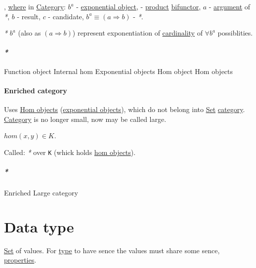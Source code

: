 \documentclass[a4paper,14pt,oneside]{book}
\begin{document}

, \hyperref[orgbe7070f]{where} in \hyperref[org82baa03]{Category}: \(b^{a}\) - \hyperref[orgab05585]{exponential object}, \texttimes{} - \hyperref[org917411a]{product} \hyperref[orga80441c]{bifunctor}, \(a\) - \hyperref[org7be5baf]{argument} of \emph{*}, \(b\) - result, \(c\) - candidate, \(b^{a} \equiv ( a \Rightarrow b )\) - \emph{*}.

\emph{*} \(b^{a}\) (also as \((a \Rightarrow b)\)) represent exponentiation of \hyperref[org650116d]{cardinality} of \(\forall b^{a}\) possiblities.

\subsubsection{\emph{*}}
\label{sec:orgf3f0c62}
\label{org10fe0e7}Function object
\label{org17ab044}Internal hom
\label{orgfe3ebba}Exponential objects
\label{org7128139}Hom object
\label{org7d2363d}Hom objects

\subsubsection{\label{orgbd9763a}Enriched category}
\label{sec:org7a4c6b8}
Uses \hyperref[org7d2363d]{Hom objects} (\hyperref[orgfe3ebba]{exponential objects}), which do not belong into \hyperref[org28abdc9]{Set} \hyperref[org82baa03]{category}.
\hyperref[org82baa03]{Category} is no longer small, now may be called large.

\(hom(x,y) \in K\).

Called: \emph{*} over \texttt{K} (whick holds \hyperref[org7d2363d]{hom objects}).

\paragraph{\emph{*}}
\label{sec:org375281d}
\label{org5155ee1}Enriched
\label{org919cb74}Large category

\chapter{\label{org89def2c}Data type}
\label{sec:org6daf422}
\hyperref[org28abdc9]{Set} of values.
For \hyperref[orgde40363]{type} to have sence the values must share some sence, \hyperref[orgaebb0b7]{properties}.
\end{document}
